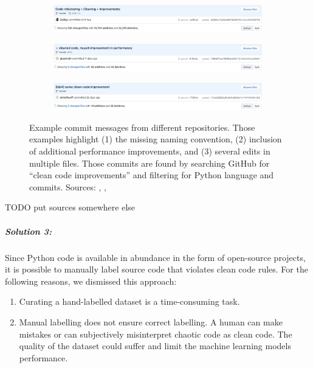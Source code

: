 \begin{figure}
    \begin{subfigure}{\textwidth}
        \includegraphics[width=1\linewidth]{img/ML/commit_messages/screen_1.png}
    \end{subfigure}
    \begin{subfigure}{\textwidth}
        \includegraphics[width=1\linewidth]{img/ML/commit_messages/screen_2.png}
    \end{subfigure}
    \begin{subfigure}{\textwidth}
        \includegraphics[width=1\linewidth]{img/ML/commit_messages/screen_3.png}
    \end{subfigure}
    \caption[Example commit messages that underline the inconsistency in commit message naming.]
    {Example commit messages from different repositories. Those examples highlight (1) the missing naming convention, (2) inclusion of additional performance improvements, and (3) several edits in multiple files. Those commits are found by searching GitHub for \enquote{clean code improvements} and filtering for Python language and commits. Sources: \footnotemark[1], \footnotemark[2], \footnotemark[3]  }
    \label{fig:commit_messages}
\end{figure}
TODO put sources somewhere else

\subparagraph{Solution 3:}
Since Python code is available in abundance in the form of open-source projects, it is possible to manually label source code that violates clean code rules. 
For the following reasons, we dismissed this approach:
\begin{enumerate}
    \item Curating a hand-labelled dataset is a time-consuming task. 
    \item Manual labelling does not ensure correct labelling. A human can make mistakes or can subjectively misinterpret chaotic code as clean code. The quality of the dataset could suffer and limit the machine learning models performance.
\end{enumerate}

